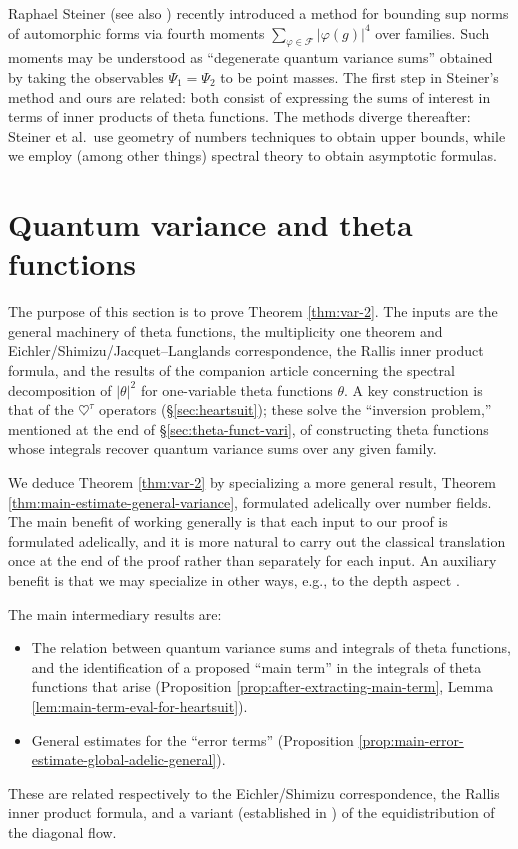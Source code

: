 \documentclass[reqno,10pt]{amsart}
\theoremstyle{plain} %
\theoremstyle{definition}
\theoremstyle{plain} %
\theoremstyle{remark}
\theoremstyle{itplain} %
\theoremstyle{remark} %
\numberwithin{equation}{section}
\begin{document}
Raphael Steiner \cite{2018arXiv181103949S} (see also \cite{2020arXiv200907194K, 2022arXiv220712351K}) recently introduced a method for bounding sup norms of automorphic forms via fourth moments $\sum_{\varphi \in \mathcal{F}} |\varphi(g)|^4$ over families.  Such moments may be understood as ``degenerate quantum variance sums'' obtained by taking the observables $\Psi_1 = \Psi_2$ to be point masses.  The first step in Steiner's method and ours are related: both consist of expressing the sums of interest in terms of inner products of theta functions.  The methods diverge thereafter: Steiner et al.\ use geometry of numbers techniques to obtain upper bounds, while we employ (among other things) spectral theory to obtain asymptotic formulas.


\part{Quantum variance and theta functions}\label{part:quant-vari-theta}
The purpose of this section is to prove Theorem \ref{thm:var-2}.  The inputs are the general machinery of theta functions, the multiplicity one theorem and Eichler/Shimizu/Jacquet--Langlands correspondence, the Rallis inner product formula, and the results of the companion article \cite{nelson-theta-squared} concerning the spectral decomposition of $|\theta|^2$ for one-variable theta functions $\theta$.  A key construction is that of the $\heartsuit^{\tau}$ operators (\S\ref{sec:heartsuit}); these solve the ``inversion problem,'' mentioned at the end of \S\ref{sec:theta-funct-vari}, of constructing theta functions whose integrals recover quantum variance sums over any given family.


We deduce Theorem \ref{thm:var-2} by specializing a more general result, Theorem \ref{thm:main-estimate-general-variance}, formulated adelically over number fields.  The main benefit of working generally is that each input to our proof is formulated adelically, and it is more natural to carry out the classical translation once at the end of the proof rather than separately for each input.  An auxiliary benefit is that we may specialize in other ways, e.g., to the depth aspect \cite{nelson-variance-II}.

The main intermediary results are:
\begin{itemize}
\item The relation between quantum variance sums and integrals of theta functions, and the identification of a proposed ``main term'' in the integrals of theta functions that arise (Proposition \ref{prop:after-extracting-main-term}, Lemma \ref{lem:main-term-eval-for-heartsuit}).
\item General estimates for the ``error terms'' (Proposition \ref{prop:main-error-estimate-global-adelic-general}).
\end{itemize}
These are related respectively to the Eichler/Shimizu correspondence, the Rallis inner product formula, and a variant (established in \cite{nelson-theta-squared}) of the equidistribution of the diagonal flow.
\end{document}
